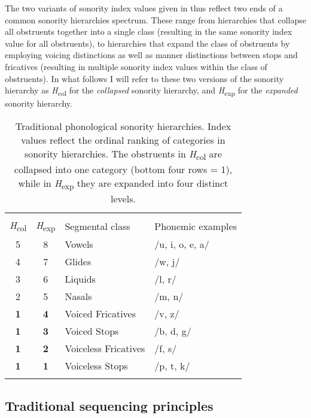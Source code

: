 The two variants of sonority index values given in  thus reflect two ends of a common sonority hierarchies spectrum. These range from hierarchies that collapse all obstruents together into a single class (resulting in the same sonority index value for all obstruents), to hierarchies that expand the class of obstruents by employing voicing distinctions as well as manner distinctions between stops and fricatives (resulting in multiple sonority index values within the class of obstruents). In what follows I will refer to these two versions of the sonority hierarchy as \emph{H}\textsubscript{col} for the \emph{collapsed} sonority hierarchy, and \emph{H}\textsubscript{exp} for the \emph{expanded} sonority hierarchy.




\begin{table}
\caption{\label{tab:hierarchy}Traditional phonological sonority hierarchies. 
Index values reflect the ordinal ranking of categories in sonority hierarchies. The obstruents in \emph{H}\textsubscript{col} are collapsed into one category (bottom four rows = 1), while in \emph{H}\textsubscript{exp} they are expanded into four distinct levels.}
\begin{tabular}{ccll}
\lsptoprule
\multicolumn{2}{c}{{Sonority index}} & &\\\cmidrule(lr){1-2}
\multicolumn{1}{c}{\emph{H}\textsubscript{col}} & \multicolumn{1}{c}{\emph{H}\textsubscript{exp}} & Segmental class & Phonemic examples\\
\midrule
5 & 8 & Vowels & \multicolumn{1}{l}{/u, i, o, e, a/}\\
4 & 7 & Glides & \multicolumn{1}{l}{/w, j/}\\
3 & 6 & Liquids & \multicolumn{1}{l}{/l, r/}\\
2 & 5 & Nasals & \multicolumn{1}{l}{/m, n/}\\
\textbf{1} & \textbf{4} & Voiced Fricatives & \multicolumn{1}{l}{/v, z/}\\
\textbf{1}& \textbf{3} & Voiced Stops & \multicolumn{1}{l}{/b, d, g/}\\
\textbf{1}& \textbf{2} & Voiceless Fricatives & \multicolumn{1}{l}{/f, s/}\\
\textbf{1}&\textbf{1} & Voiceless Stops & \multicolumn{1}{l}{/p, t, k/}\\
\lspbottomrule
\end{tabular}
\end{table}

\subsection{Traditional sequencing principles}\label{sec:principles}


